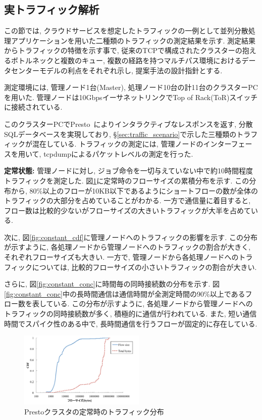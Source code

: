\documentclass[11pt, a4paper, uplatex]{jsarticle}
\begin{document}
\subsection{実トラフィック解析}

この節では, クラウドサービスを想定したトラフィックの一例として並列分散処理アプリケーションを用いた二種類のトラフィックの測定結果を示す.
測定結果からトラフィックの特徴を示す事で, 従来のTCPで構成されたクラスターの抱えるボトルネックと複数のキュー,
複数の経路を持つマルチパス環境におけるデータセンターモデルの利点をそれぞれ示し, 提案手法の設計指針とする.

測定環境には, 管理ノード1台(Master), 処理ノード10台の計11台のクラスターPCを用いた.
管理ノードは10GbpsイーサネットリンクでTop of Rack(ToR)スイッチに接続されている.

このクラスターPCでPresto~\cite{presto}によりインタラクティブなレスポンスを返す, 分散SQLデータベースを実現しており,
\S \ref{sec:traffic_scenario}で示した三種類のトラフィックが混在している.
トラフィックの測定には, 管理ノードのインターフェースを用いて, tcpdump\cite{tcpdump}によるパケットレベルの測定を行った.

{\bf 定常状態: }
管理ノードに対し, ジョブ命令を一切与えていない中で約10時間程度トラフィックを測定した.
図\ref{fig:constant}に定常時のフローサイズの累積分布を示す.
この分布から, 80\%以上のフローが10KB以下であるようにショートフローの数が全体のトラフィックの大部分を占めていることがわかる.
一方で通信量に着目すると, フロー数は比較的少ないがフローサイズの大きいトラフィックが大半を占めている.

次に, 図\ref{fig:constant_cdf}に管理ノードへのトラフィックの影響を示す.
この分布が示すように, 各処理ノードから管理ノードへのトラフィックの割合が大きく, それぞれフローサイズも大きい.
一方で, 管理ノードから各処理ノードへのトラフィックについては, 比較的フローサイズの小さいトラフィックの割合が大きい.

さらに, 図\ref{fig:constant_conc}に時間毎の同時接続数の分布を示す.
図\ref{fig:constant_conc}中の長時間通信は通信時間が全測定時間の90\%以上であるフロー数を表している.
この分布が示すように, 各処理ノードから管理ノードへのトラフィックの同時接続数が多く, 積極的に通信が行われている.
また, 短い通信時間でスパイク性のある中で, 長時間通信を行うフローが固定的に存在している.
\begin{figure}[t]
    \begin{center}
    \includegraphics[autoebb, width=170pt]{./img/constant.pdf}
    \caption{Prestoクラスタの定常時のトラフィック分布}
    \label{fig:constant}
    \end{center}
\end{figure}
\end{document}
